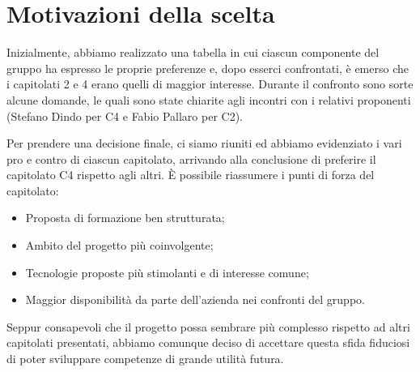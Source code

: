 \section{Motivazioni della scelta}
Inizialmente, abbiamo realizzato una tabella in cui ciascun componente del gruppo ha espresso le proprie preferenze e, dopo esserci confrontati, è emerso che i capitolati 2 e 4 erano quelli di maggior interesse. Durante il confronto sono sorte alcune domande, le quali sono state chiarite agli incontri con i relativi proponenti (Stefano Dindo per C4 e Fabio Pallaro per C2).

Per prendere una decisione finale, ci siamo riuniti ed abbiamo evidenziato i vari pro e contro di ciascun capitolato, arrivando alla conclusione di preferire il capitolato C4 rispetto agli altri. È possibile riassumere i punti di forza del capitolato: 
\begin{itemize}
	\item Proposta di formazione ben strutturata;
	\item Ambito del progetto più coinvolgente;
	\item Tecnologie proposte più stimolanti e di interesse comune;
	\item Maggior disponibilità da parte dell’azienda nei confronti del gruppo.
\end{itemize}
Seppur consapevoli che il progetto possa sembrare più complesso rispetto ad altri capitolati presentati, abbiamo comunque deciso di accettare questa sfida fiduciosi di poter sviluppare competenze di grande utilità futura.



